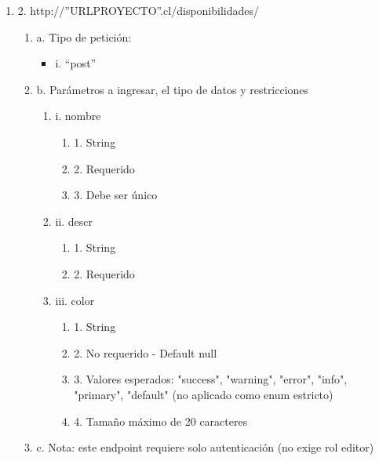 \begin{enumerate}
    \item 2. http://”URLPROYECTO”.cl/disponibilidades/
    \begin{enumerate}
        \item a. Tipo de petición:
            \begin{itemize}
               \item i. “post”
            \end{itemize}
        \item b. Parámetros a ingresar, el tipo de datos y restricciones
            \begin{enumerate}
                \item i. nombre
                    \begin{enumerate}
                        \item 1. String
                        \item 2. Requerido
                        \item 3. Debe ser único
                    \end{enumerate}
                \item ii. descr
                    \begin{enumerate}
                        \item 1. String
                        \item 2. Requerido
                    \end{enumerate}
                \item iii. color
                    \begin{enumerate}
                        \item 1. String
                        \item 2. No requerido - Default null
                        \item 3. Valores esperados: "success", "warning", "error", "info", "primary", "default" (no aplicado como enum estricto)
                        \item 4. Tamaño máximo de 20 caracteres
                    \end{enumerate}
            \end{enumerate}
        \item c. Nota: este endpoint requiere solo autenticación (no exige rol editor)
    \end{enumerate}


\end{enumerate}
